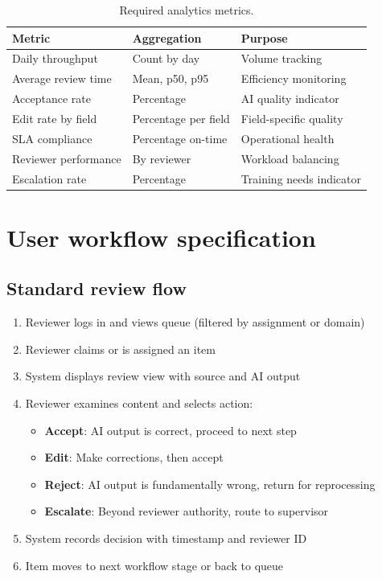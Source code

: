 \begin{table}[htbp]
\centering
\caption{Required analytics metrics.}
\label{tab:analytics-metrics}
\footnotesize
\begin{tabularx}{\linewidth}{@{}l l X@{}}
\toprule
\textbf{Metric} & \textbf{Aggregation} & \textbf{Purpose} \\ \midrule
Daily throughput & Count by day & Volume tracking \\
Average review time & Mean, p50, p95 & Efficiency monitoring \\
Acceptance rate & Percentage & AI quality indicator \\
Edit rate by field & Percentage per field & Field-specific quality \\
SLA compliance & Percentage on-time & Operational health \\
Reviewer performance & By reviewer & Workload balancing \\
Escalation rate & Percentage & Training needs indicator \\
\bottomrule
\end{tabularx}
\end{table}

\section{User workflow specification}

\subsection{Standard review flow}

\begin{enumerate}
  \item Reviewer logs in and views queue (filtered by assignment or domain)
  \item Reviewer claims or is assigned an item
  \item System displays review view with source and AI output
  \item Reviewer examines content and selects action:
    \begin{itemize}
      \item \textbf{Accept}: AI output is correct, proceed to next step
      \item \textbf{Edit}: Make corrections, then accept
      \item \textbf{Reject}: AI output is fundamentally wrong, return for reprocessing
      \item \textbf{Escalate}: Beyond reviewer authority, route to supervisor
    \end{itemize}
  \item System records decision with timestamp and reviewer ID
  \item Item moves to next workflow stage or back to queue
\end{enumerate}

